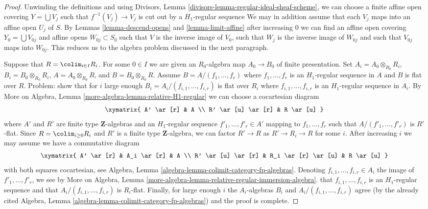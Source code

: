 \begin{proof}
Unwinding the definitions and using Divisors, Lemma
\ref{divisors-lemma-regular-ideal-sheaf-scheme},
we can choose a finite affine open
covering $Y = \bigcup V_j$ such that $f^{-1}(V_j) \to V_j$ is cut
out by a $H_1$-regular sequence
We may in addition assume that each $V_j$ maps into an affine open
$U_j$ of $S$.
By Lemmas \ref{lemma-descend-opens} and \ref{lemma-limit-affine}
after increasing $0$ we can find an affine open covering
$Y_0 = \bigcup V_{0j}$ and affine opens $W_{0j} \subset S_0$
such that $V$ is the inverse image of $V_0$, such that $W_j$ is the
inverse image of $W_{0j}$ and such that $V_{0j}$ maps into $W_{0j}$.
This reduces us to the algebra problem discussed in the next
paragraph.

\medskip\noindent
Suppose that $R = \colim_{i \in I} R_i$. For some $0 \in I$ we are given
an $R_0$-algebra map $A_0 \to B_0$ of finite presentation. Set
$A_i = A_0 \otimes_{R_0} R_i$, $B_i = B_0 \otimes_{R_0} R_i$,
$A = A_0 \otimes_{R_0} R$, and $B = B_0 \otimes_{R_0} R$.
Assume $B = A/(f_1, \ldots, f_r)$ where $f_1, \ldots, f_r$
is an $H_1$-regular sequence in $A$ and $B$ is flat over $R$.
Problem: show that for $i$ large enough
$B_i = A_i/(f_{i, 1}, \ldots, f_{i, r})$ is flat over $R_i$
where $f_{i, 1}, \ldots, f_{i, r}$ is an $H_1$-regular sequence
in $A_i$. By More on Algebra, Lemma
\ref{more-algebra-lemma-relative-H1-regular}
we can choose a cocartesian diagram
$$
\xymatrix{
A' \ar[r] & A \\
R' \ar[u] \ar[r] & R \ar[u]
}
$$
where $A'$ and $R'$ are finite type $\mathbf{Z}$-algebras
and an $H_1$-regular sequence $f'_1, \ldots, f'_r \in A'$
mapping to $f_1, \ldots, f_r$ such that $A/(f'_1, \ldots, f'_r)$
is $R'$-flat. Since $R = \colim_{i \geq 0} R_i$
and $R'$ is a finite type $\mathbf{Z}$-algebra, we can factor
$R' \to R$ as $R' \to R_i \to R$ for some $i$.
After increasing $i$ we may assume we have a commutative diagram
$$
\xymatrix{
A' \ar[r] & A_i \ar[r] & A \\
R' \ar[u] \ar[r] & R_i \ar[r] \ar[u] & R \ar[u]
}
$$
with both squares cocartesian, see
Algebra, Lemma \ref{algebra-lemma-colimit-category-fp-algebras}.
Denoting $f_{i, 1}, \ldots, f_{i, r} \in A_i$ the image of
$f'_1, \ldots, f'_r$, we see by More on Algebra, Lemma
\ref{more-algebra-lemma-relative-regular-immersion-algebra}.
that $f_{i, 1}, \ldots, f_{i, r}$ is an $H_1$-regular sequence
and that $A_i/(f_{i, 1}, \ldots, f_{i, r})$ is $R_i$-flat.
Finally, for large enough $i$ the $A_i$-algebras $B_i$ and
$A_i/(f_{i, 1}, \ldots, f_{i, r})$ agree (by the already cited
Algebra, Lemma \ref{algebra-lemma-colimit-category-fp-algebras})
and the
proof is complete.
\end{proof}




